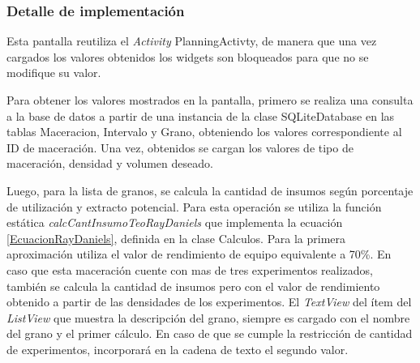             \subsubsection{Detalle de implementación}
            \par Esta pantalla reutiliza el \textit{Activity} PlanningActivty, de manera que una vez cargados los valores obtenidos los widgets son bloqueados para que no se modifique su valor. 
            \par Para obtener los valores mostrados en la pantalla, primero se realiza una consulta a la base de datos a partir de una instancia de la clase SQLiteDatabase en las tablas Maceracion, Intervalo y Grano, obteniendo los valores correspondiente al ID de maceración. Una vez, obtenidos se cargan los valores de tipo de maceración, densidad y volumen deseado. 
            
            \par Luego, para la lista de granos, se calcula la cantidad de insumos según porcentaje de utilización y extracto potencial. Para esta operación se utiliza la función estática \textit{calcCantInsumoTeoRayDaniels} que implementa la ecuación \ref{EcuacionRayDaniels}, definida en la clase Calculos. Para la primera aproximación utiliza el valor de rendimiento de equipo equivalente a 70\%. En caso que esta maceración cuente con mas de tres experimentos realizados, también se calcula la cantidad de insumos pero con el valor de rendimiento obtenido a partir de las densidades de los experimentos. El \textit{TextView} del ítem del \textit{ListView} que muestra la descripción del grano, siempre es cargado con el nombre del grano y el primer cálculo. En caso de que se cumple la restricción de cantidad de experimentos, incorporará en la cadena de texto el segundo valor.
            
